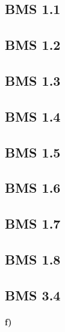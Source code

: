 \documentclass[
]{article}
\begin{document}
\hypertarget{bms-1.1}{%
\subsection{BMS 1.1}\label{bms-1.1}}

\hypertarget{bms-1.2}{%
\subsection{BMS 1.2}\label{bms-1.2}}

\hypertarget{bms-1.3}{%
\subsection{BMS 1.3}\label{bms-1.3}}

\hypertarget{bms-1.4}{%
\subsection{BMS 1.4}\label{bms-1.4}}

\hypertarget{bms-1.5}{%
\subsection{BMS 1.5}\label{bms-1.5}}

\hypertarget{bms-1.6}{%
\subsection{BMS 1.6}\label{bms-1.6}}

\hypertarget{bms-1.7}{%
\subsection{BMS 1.7}\label{bms-1.7}}

\hypertarget{bms-1.8}{%
\subsection{BMS 1.8}\label{bms-1.8}}

\hypertarget{bms-3.4}{%
\subsection{BMS 3.4}\label{bms-3.4}}

\hypertarget{f-1}{%
\paragraph{\texorpdfstring{\textbf{f)}}{f)}}\label{f-1}}
\end{document}
